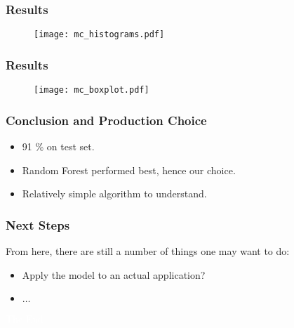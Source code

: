 \documentclass{beamer}
\begin{document}
\begin{frame}
  \frametitle{Results}
  \begin{figure}[ht]
    \centering
    \texttt{[image: mc\_histograms.pdf]}
    \label{fig:mc-histograms}
  \end{figure}
\end{frame}


\begin{frame}
  \frametitle{Results}
  \begin{figure}[ht]
    \centering
    \texttt{[image: mc\_boxplot.pdf]}
    \label{fig:mc-boxplot}
  \end{figure}
\end{frame}


\begin{frame}
  \frametitle{Conclusion and Production Choice}
  \begin{itemize}
  \item 91 \% on test set.
  \item Random Forest performed best, hence our choice.
  \item Relatively simple algorithm to understand.
  \end{itemize}

\end{frame}


\begin{frame}
  \frametitle{Next Steps}

  From here, there are still a number of things one may want to do:

  \begin{itemize}
  \item Apply the model to an actual application?
  \item $\ldots$
  \end{itemize}

\end{frame}

\bgroup
{}
\begin{frame}[t,plain]{}{}
  \begin{center}
    {\tiny \textcolor{white}{The End}}
  \end{center}
\end{frame}
\egroup
\end{document}
